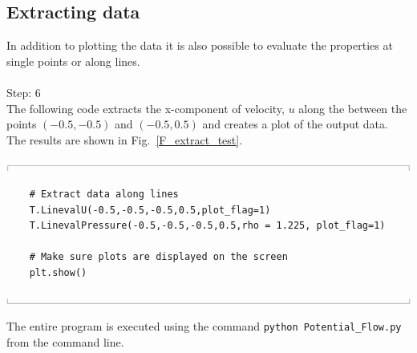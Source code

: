 \documentclass[10pt,a4paper]{article}
\newcommand{\topbar}{\ensuremath{
    \rule{0.1mm}{2.0mm} \rule[2.0mm]{159.5mm}{0.1mm} \rule{0.1mm}{2.0mm}
}}
\newcommand{\bottombar}{\ensuremath{
    \rule{0.1mm}{2.0mm} \rule{159.5mm}{0.1mm} \rule{0.1mm}{2.0mm}
}}
\begin{document}
\subsection{Extracting data}
In addition to plotting the data it is also possible to evaluate the properties at single points or along lines. 
\\ \\
\noindent
{\LARGE Step: 6}\\
The following code extracts the x-component of velocity, $u$ along the between the points $(-0.5, -0.5)$ and $(-0.5, 0.5)$ and creates a plot of the output data. 
The results are shown in Fig.~\ref{F_extract_test}.

\noindent
\topbar
\begin{lstlisting}
    # Extract data along lines
    T.LinevalU(-0.5,-0.5,-0.5,0.5,plot_flag=1)
    T.LinevalPressure(-0.5,-0.5,-0.5,0.5,rho = 1.225, plot_flag=1)

    # Make sure plots are displayed on the screen
    plt.show()
\end{lstlisting}
\bottombar

\noindent
The entire program is executed using the command \verb'python Potential_Flow.py' from the command line. 
\end{document}
